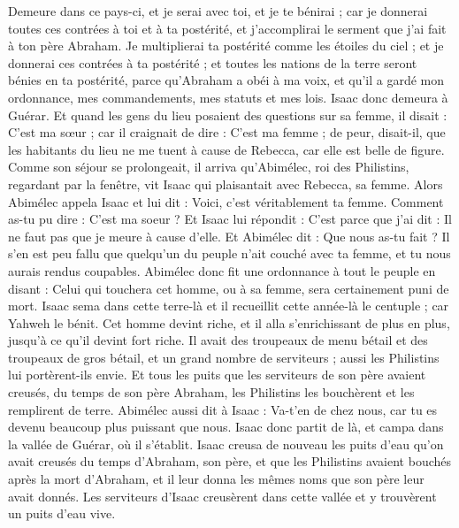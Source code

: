 \begin{multicols}{2}
Demeure dans ce pays-ci, et je serai avec toi, et je te bénirai ; car je donnerai toutes ces contrées à toi et à ta postérité, et j’accomplirai le serment que j'ai fait à ton père Abraham.
Je multiplierai ta postérité comme les étoiles du ciel ; et je donnerai ces contrées à ta postérité ; et toutes les nations de la terre seront bénies en ta postérité,
parce qu'Abraham a obéi à ma voix, et qu'il a gardé mon ordonnance, mes commandements, mes statuts et mes lois.
Isaac donc demeura à Guérar.
Et quand les gens du lieu posaient des questions sur sa femme, il disait : C'est ma sœur ; car il craignait de dire : C'est ma femme ; de peur, disait-il, que les habitants du lieu ne me tuent à cause de Rebecca, car elle est belle de figure.
Comme son séjour se prolongeait, il arriva qu'Abimélec, roi des Philistins, regardant par la fenêtre, vit Isaac qui plaisantait avec Rebecca, sa femme.
Alors Abimélec appela Isaac et lui dit : Voici, c'est véritablement ta femme. Comment as-tu pu dire : C'est ma soeur ? Et Isaac lui répondit : C'est parce que j'ai dit : Il ne faut pas que je meure à cause d'elle.
Et Abimélec dit : Que nous as-tu fait ? Il s'en est peu fallu que quelqu'un du peuple n'ait couché avec ta femme, et tu nous aurais rendus coupables.
Abimélec donc fit une ordonnance à tout le peuple en disant : Celui qui touchera cet homme, ou à sa femme, sera certainement puni de mort.
Isaac sema dans cette terre-là et il recueillit cette année-là le centuple ; car Yahweh le bénit.
Cet homme devint riche, et il alla s’enrichissant de plus en plus, jusqu'à ce qu'il devint fort riche.
Il avait des troupeaux de menu bétail et des troupeaux de gros bétail, et un grand nombre de serviteurs ; aussi les Philistins lui portèrent-ils envie.
Et tous les puits que les serviteurs de son père avaient creusés, du temps de son père Abraham, les Philistins les bouchèrent et les remplirent de terre.
Abimélec aussi dit à Isaac : Va-t’en de chez nous, car tu es devenu beaucoup plus puissant que nous.
Isaac donc partit de là, et campa dans la vallée de Guérar, où il s’établit.
Isaac creusa de nouveau les puits d'eau qu'on avait creusés du temps d'Abraham, son père, et que les Philistins avaient bouchés après la mort d'Abraham, et il leur donna les mêmes noms que son père leur avait donnés.
Les serviteurs d'Isaac creusèrent dans cette vallée et y trouvèrent un puits d'eau vive.

\end{multicols}
